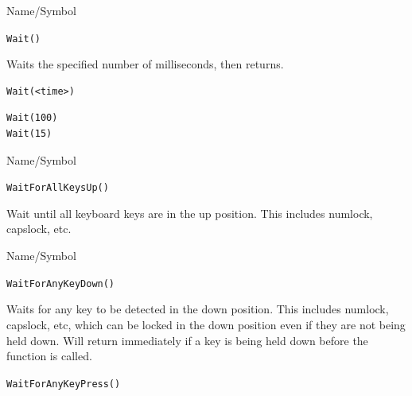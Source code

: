 \vfill
\newpage
{}
\vfill



\begin{desc}{Name/Symbol}
\item[Name/Symbol]  	\verb+Wait()+ 

\item[Description] 	Waits the specified number of milliseconds, then returns. 

\item[Usage]
\begin{verbatim}
Wait(<time>)
\end{verbatim}

\item[Example]
\begin{verbatim}
Wait(100)
Wait(15)
\end{verbatim}

\item[See Also]	
\end{desc}




\begin{desc}{Name/Symbol}
\item[Name/Symbol]  	\verb+WaitForAllKeysUp()+

\item[Description]	
               Wait until all keyboard keys are in the up
               position. This includes numlock, capslock, etc.
\item[Usage]		

\item[Example]	

\item[See Also]	

\end{desc}




\begin{desc}{Name/Symbol}
\item[Name/Symbol]  	\verb+WaitForAnyKeyDown()+

\item[Description]	
             Waits for any key to be detected in the down position.
             This includes numlock, capslock, etc, which can be locked
             in the down position even if they are not being held
             down.  Will return immediately if a key is being held
             down before the function is called. 

\item[Usage]		

\item[Example]	

\item[See Also]	
            \verb+WaitForAnyKeyPress()+
\end{desc}





